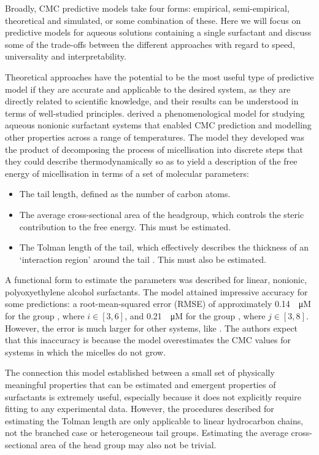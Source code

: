 Broadly, CMC predictive models take four forms: empirical, semi-empirical, theoretical and simulated, or some combination of these. Here we will focus on predictive models for aqueous solutions containing a single surfactant and discuss some of the trade-offs between the different approaches with regard to speed, universality and interpretability.

Theoretical approaches have the potential to be the most useful type of
predictive model if they are accurate and applicable to the desired system, as they are directly related to scientific knowledge, and their results can be understood in terms of well-studied principles.
\citet{puvvadaMolecularThermodynamicApproach1990} derived a phenomenological model for studying aqueous nonionic surfactant systems that enabled CMC prediction and modelling other properties across a range of temperatures. The model they developed was the product of decomposing the process of micellisation into discrete steps that they could describe thermodynamically so as to yield a description of the free energy of micellisation in terms of a set of molecular parameters:

\begin{itemize}
    \item The tail length, defined as the number of carbon atoms.
    \item The average cross-sectional area of the headgroup, which controls the
          steric contribution to the free energy. This must be estimated.
    \item The Tolman length of the tail, which effectively describes the
          thickness of an `interaction region' around the tail
          \cite{demiguelGibbsThermodynamicsSurface2021}. This must also be estimated.
\end{itemize}

A functional form to estimate the parameters was described for linear, nonionic, polyoxyethylene alcohol surfactants. The model attained impressive accuracy for some predictions: a root-mean-squared error (RMSE) of approximately \SI{0.14}{\log \micro M} for the group , where $i \in [3, 6]$, and \SI{0.21}{\log \micro M} for the group , where $j \in [3, 8]$.
However, the error is much larger for other systems, like . The
authors expect that this inaccuracy is because the model overestimates the CMC values for systems in which the micelles do not grow.

The connection this model established between a small set of physically meaningful properties that can be estimated and emergent properties of surfactants is extremely useful, especially because it does not explicitly require fitting to any experimental data. However, the procedures described for estimating the Tolman length are only applicable to linear hydrocarbon chains, not the branched case or heterogeneous tail groups. Estimating the average cross-sectional area of the head group may also not be trivial.

